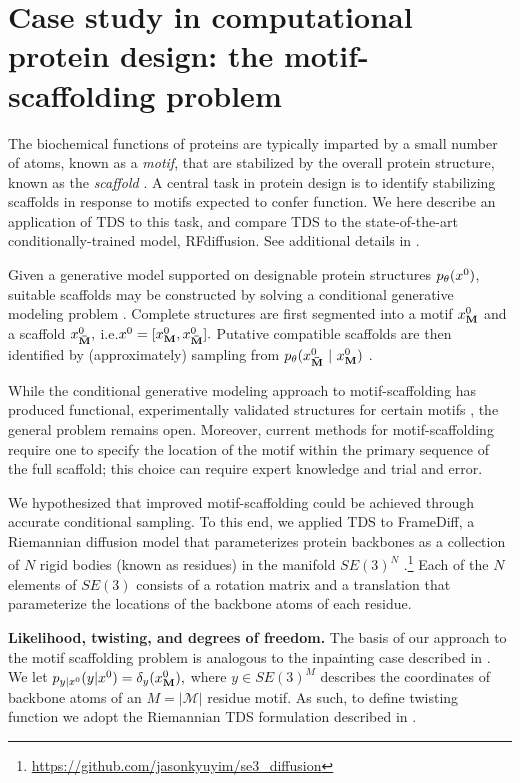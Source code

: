 \section{Case study in computational protein design: the motif-scaffolding problem}\label{sec:exp-protein}

The biochemical functions of proteins are typically imparted by a small number of atoms, known as a \emph{motif}, that are stabilized by the overall protein structure, known as the \emph{scaffold} \citep{wang2022scaffolding}.
A central task in protein design is to identify stabilizing scaffolds in response to motifs expected to confer function.
We here describe an application of TDS to this task, and compare TDS to the state-of-the-art conditionally-trained model, RFdiffusion. See additional details in .


Given a generative model supported on designable protein structures $p_{\theta}(x^{0})$,
suitable scaffolds may be constructed by solving a conditional generative modeling problem \citep{trippe2022diffusion}.
Complete structures are first segmented into a motif $x^{0}_{\mathbf{M}}$ and a scaffold $x^{0}_{\mathbf{\bar M}},$ i.e.\@ $x^{0} = [x^{0}_{\mathbf{M}}, x^{0}_{\mathbf{\bar M}}].$ 
Putative compatible scaffolds are then identified by (approximately) sampling from $p_{\theta}(x^{0}_{\mathbf{\bar M}} ~\vert~ x^{0}_{\mathbf{M}})
$ \citep{trippe2022diffusion}.

While the conditional generative modeling approach to motif-scaffolding has produced functional, experimentally validated structures for certain motifs \citep{watson2022broadly}, the general problem remains open.
Moreover, current methods for motif-scaffolding require one to specify the location of the motif within the primary sequence of the full scaffold;
this choice can require expert knowledge and trial and error.

We hypothesized that improved motif-scaffolding could be achieved through accurate conditional sampling.
To this end, we applied TDS to FrameDiff, a Riemannian diffusion model that parameterizes protein backbones as a collection of $N$ rigid bodies 
 (known as residues) in the manifold $SE(3)^N$ \citep{yim2023se}.\footnote{\url{https://github.com/jasonkyuyim/se3_diffusion}}
Each of the $N$ elements of $SE(3)$ consists of a rotation matrix and a translation that parameterize the locations of the backbone atoms of each residue.

\textbf{Likelihood, twisting, and degrees of freedom.}
The basis of our approach to the motif scaffolding problem is analogous to the inpainting case described in .
We let $p_{y|x^{0}}({y}|{x^{0}})=\delta_y(x^{0}_{\mathbf{M}}),$
where $y\in SE(3)^M$ describes the coordinates of backbone atoms of an $M=|\mathcal{M}|$ residue motif.
As such, to define twisting function we adopt the Riemannian TDS formulation described in  .



